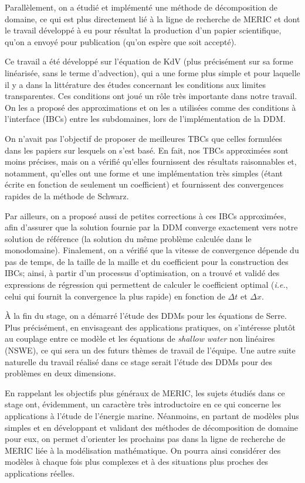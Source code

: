 \indent Parallèlement, on a étudié et implémenté une méthode de décomposition de domaine, ce qui est plus directement lié à la ligne de recherche de MERIC et dont le travail développé à eu pour résultat la production d'un papier scientifique, qu'on a envoyé pour publication (qu'on espère que soit accepté).

\indent Ce travail a été développé sur l'équation de KdV (plus précisément sur sa forme linéarisée, sans le terme d'advection), qui a une forme plus simple et pour laquelle il y a dans la littérature des études concernant les conditions aux limites transparentes. Ces conditions ont joué un rôle très importante dans notre travail. On les a proposé des approximations et on les a utilisées comme des conditions à l'interface (IBCs) entre les subdomaines, lors de l'implémentation de la DDM.

\indent On n'avait pas l'objectif de proposer de meilleures TBCs que celles formulées dans les papiers sur lesquels on s'est basé. En fait, nos TBCs approximées sont moins précises, mais on a vérifié qu'elles fournissent des résultats raisonnables et, notamment, qu'elles ont une forme et une implémentation très simples (étant écrite en fonction de seulement un coefficient) et fournissent des convergences rapides de la méthode de Schwarz.

\indent Par ailleurs, on a proposé aussi de petites corrections à ces IBCs approximées, afin d'assurer que la solution fournie par la DDM converge exactement vers notre solution de référence (la solution du même problème calculée dans le monodomaine). Finalement, on a vérifié que la vitesse de convergence dépende du pas de temps, de la taille de la maille et du coefficient pour la construction des IBCs; ainsi, à partir d'un processus d'optimisation, on a trouvé et validé des expressions de régression qui permettent de calculer le coefficient optimal (\emph{i.e.}, celui qui fournit la convergence la plus rapide) en fonction de $\Delta t $ et $\Delta x$.

\indent À la fin du stage, on a démarré l'étude des DDMs pour les équations de Serre. Plus précisément, en envisageant des applications pratiques, on s'intéresse plutôt au couplage entre ce modèle et les équations de \emph{shallow water} non linéaires (NSWE), ce qui sera un des futurs thèmes de travail de l'équipe. Une autre suite naturelle du travail réalisé dans ce stage serait l'étude des DDMs pour des problèmes en deux dimensions.

\indent En rappelant les objectifs plus généraux de MERIC, les sujets étudiés dans ce stage ont, évidemment, un caractère très introductoire en ce qui concerne les applications à l'étude de l'énergie marine. Néanmoins, en partant de modèles plus simples et en développant et validant des méthodes de décomposition de domaine pour eux, on permet d'orienter les prochains pas dans la ligne de recherche de MERIC liée à la modélisation mathématique. On pourra ainsi considérer des modèles à chaque fois plus complexes et à des situations plus proches des applications réelles.